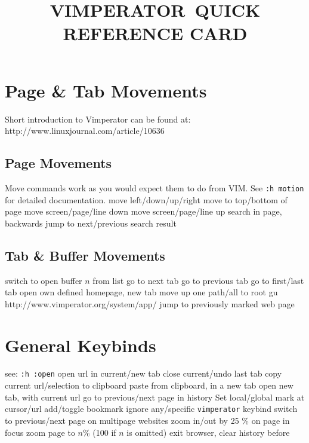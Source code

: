 
\def\content{VIMPERATOR}
\def\versionnumber{1.3}  %

\def\version{v\versionnumber\ \month\ \year}




\title{\uppercase{\content\ quick reference card}}

\shortintro

\section{Page \& Tab Movements}{Short introduction to Vimperator can be found
at:\\http://www.linuxjournal.com/article/10636}
\subsection{Page Movements}{Move commands work as you would expect them to do
from VIM. See {\tt :h motion} for detailed documentation.}
	{move left/down/up/right}
	{move to top/bottom of page}
	{move screen/page/line down}
	{move screen/page/line up}
	{search in page, backwards}
	{jump to next/previous search result}


\subsection{Tab \& Buffer Movements}{}
	{switch to open buffer $n$ from list}
	{go to next tab}
	{go to previous tab}
	{go to first/last tab}
	{open own defined homepage, new tab}
	{move up one path/all to root}
	{gu http://www.vimperator.org/system/app/}
	{jump to previously marked web page}


\section{General Keybinds}{see: {\tt :h :open}}
	{open url in current/new tab}
	{close current/undo last tab}
	{copy current url/selection to clipboard}
	{paste from clipboard, in a new tab}
	{open new tab, with current url}
	{go to previous/next page in history}
	{Set local/global mark at cursor/url}
	{add/toggle bookmark}
	{ignore any/specific {\tt vimperator} keybind}
\cmdS{\lbracket\lbracket~\rbracket\rbracket}	{switch to previous/next page on multipage websites}
\cmdS{+~-}	{zoom in/out by 25 \% on page in focus}
	{zoom page to $n$\% (100 if $n$ is omitted)}
	{exit browser, clear history before}

